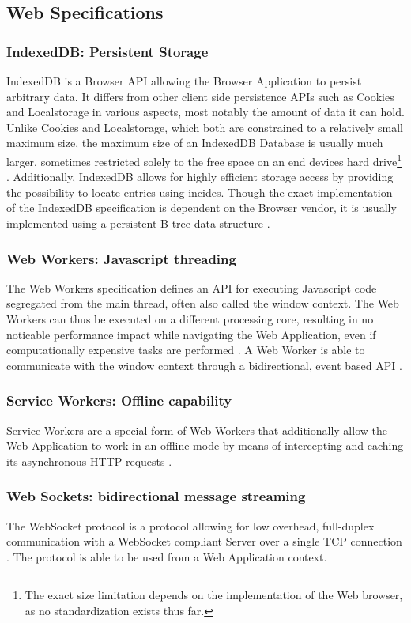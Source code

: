 \subsection{Web Specifications}
\subsubsection{IndexedDB: Persistent Storage}
IndexedDB is a Browser API allowing the Browser Application to persist arbitrary data. It differs from other client side persistence APIs such as Cookies and Localstorage in various aspects, most notably the amount of data it can hold. Unlike Cookies and Localstorage, which both are constrained to a relatively small maximum size, the maximum size of an IndexedDB Database is usually much larger, sometimes restricted solely to the free space on an end devices hard drive\footnote{The exact size limitation depends on the implementation of the Web browser, as no standardization exists thus far.} \cite{MDNIndexedDB}. Additionally, IndexedDB allows for highly efficient storage access by providing the possibility to locate entries using incides. Though the exact implementation of the IndexedDB specification is dependent on the Browser vendor, it is usually implemented using a persistent B-tree data structure \cite[sec. 1]{IndexedDBSpec}.
\subsubsection{Web Workers: Javascript threading}
The Web Workers specification defines an API for executing Javascript code segregated from the main thread, often also called the window context. The Web Workers can thus be executed on a different processing core, resulting in no noticable performance impact while navigating the Web Application, even if computationally expensive tasks are performed \cite[sec. 1.2.1]{workerdraft}. A Web Worker is able to communicate with the window context through a bidirectional, event based API \cite[sec. 4.6.1]{workerdraft}.
\subsubsection{Service Workers: Offline capability}
Service Workers are a special form of Web Workers that additionally allow the Web Application to work in an offline mode by means of intercepting and caching its asynchronous HTTP requests \cite[sec 4.5, 5]{serviceworkersdraft}.
\subsubsection{Web Sockets: bidirectional message streaming}
The WebSocket protocol is a protocol allowing for low overhead, full-duplex communication with a WebSocket compliant Server over a single TCP connection \cite[sec. 1.1]{rfc6455}. The protocol is able to be used from a Web Application context.
\label{sec:tech-web-sockets}

